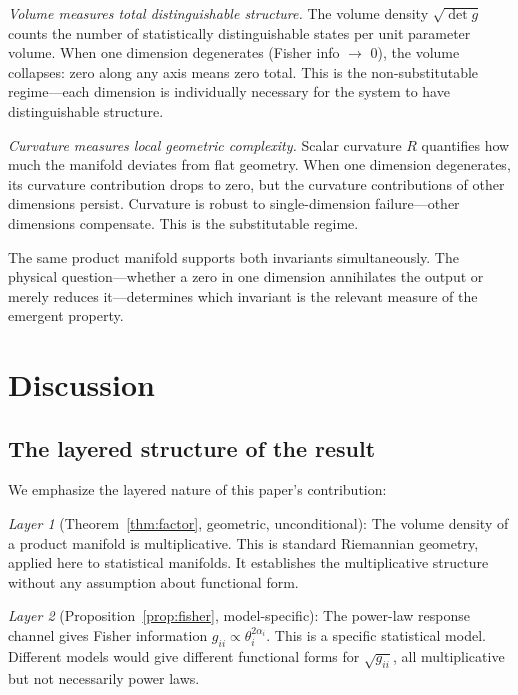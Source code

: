\documentclass[12pt, a4paper]{article}
\theoremstyle{definition}
\theoremstyle{remark}
\begin{document}
\textit{Volume measures total distinguishable structure.} The volume density $\sqrt{\det g}$ counts the number of statistically distinguishable states per unit parameter volume. When one dimension degenerates (Fisher info $\to$ 0), the volume collapses: zero along any axis means zero total. This is the non-substitutable regime---each dimension is individually necessary for the system to have distinguishable structure.

\textit{Curvature measures local geometric complexity.} Scalar curvature $R$ quantifies how much the manifold deviates from flat geometry. When one dimension degenerates, its curvature contribution drops to zero, but the curvature contributions of other dimensions persist. Curvature is robust to single-dimension failure---other dimensions compensate. This is the substitutable regime.

The same product manifold supports both invariants simultaneously. The physical question---whether a zero in one dimension annihilates the output or merely reduces it---determines which invariant is the relevant measure of the emergent property.

\section{Discussion}\label{sec:discussion}

\subsection{The layered structure of the result}

We emphasize the layered nature of this paper's contribution:

\textit{Layer 1} (Theorem~\ref{thm:factor}, geometric, unconditional): The volume density of a product manifold is multiplicative. This is standard Riemannian geometry, applied here to statistical manifolds. It establishes the multiplicative structure without any assumption about functional form.

\textit{Layer 2} (Proposition~\ref{prop:fisher}, model-specific): The power-law response channel gives Fisher information $g_{ii} \propto \theta_i^{2\alpha_i}$. This is a specific statistical model. Different models would give different functional forms for $\sqrt{g_{ii}}$, all multiplicative but not necessarily power laws.
\end{document}
